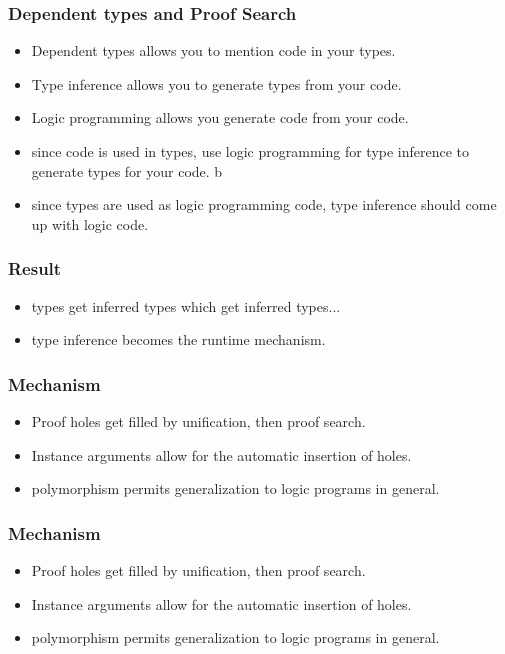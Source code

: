 
\begin{frame}
\frametitle{Dependent types and Proof Search}
\begin{itemize}

\item Dependent types allows you to mention code in your types.
\item Type inference allows you to generate types from your code.
\item Logic programming allows you generate code from your code.
\item since code is used in types, use logic programming for type inference to generate types for your code.
b\item since types are used as logic programming code, type inference should come up with logic code.

\end{itemize}
\end{frame}


\begin{frame}
\frametitle{Result}
\begin{itemize}

\item types get inferred types which get inferred types... 
\item type inference becomes the runtime mechanism.

\end{itemize}
\end{frame}


\begin{frame}
\frametitle{Mechanism}
\begin{itemize}

\item Proof holes get filled by unification, then proof search.
\item Instance arguments allow for the automatic insertion of holes.
\item polymorphism permits generalization to logic programs in general.

\end{itemize}
\end{frame}


\begin{frame}
\frametitle{Mechanism}
\begin{itemize}

\item Proof holes get filled by unification, then proof search.
\item Instance arguments allow for the automatic insertion of holes.
\item polymorphism permits generalization to logic programs in general.

\end{itemize}
\end{frame}

